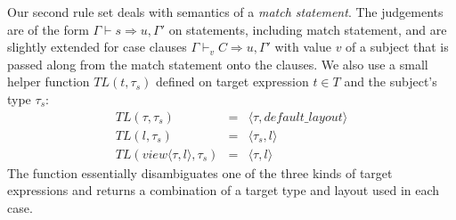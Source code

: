 \documentclass[preprint]{sigplanconf}
\newcommand{\evals}{\Rightarrow}
\begin{document}
Our second rule set deals with semantics of a \emph{match statement}. The 
judgements are of the form $\Gamma\vdash s \evals u,\Gamma'$ on statements, 
including match statement, and are slightly extended for case clauses 
$\Gamma\vdash_v C \evals u,\Gamma'$ with value $v$ of a subject that is passed 
along from the match statement onto the clauses. We also use a small helper 
function $TL(t,\tau_s)$ defined on target expression $t \in T$ and the subject's 
type $\tau_s$:
\begin{eqnarray*}
    TL(\tau,\tau_s)                     &=& \langle \tau,  default\_layout \rangle \\
	TL(l,\tau_s)                        &=& \langle \tau_s, l \rangle \\
	TL(view\langle\tau,l\rangle,\tau_s) &=& \langle \tau,   l \rangle
\end{eqnarray*}
\noindent
The function essentially disambiguates one of the three kinds of target 
expressions and returns a combination of a target type and layout used in each 
case.
\end{document}
